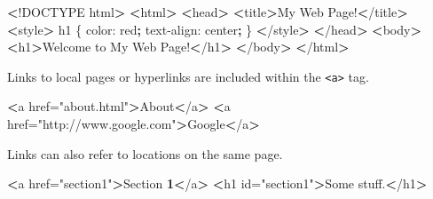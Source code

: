 \documentclass[]{book}
\newenvironment{Shaded}{\begin{snugshade}}{\end{snugshade}}
\newcommand{\KeywordTok}[1]{\textcolor[rgb]{0.13,0.29,0.53}{\textbf{#1}}}
\newcommand{\StringTok}[1]{\textcolor[rgb]{0.31,0.60,0.02}{#1}}
\newcommand{\FunctionTok}[1]{\textcolor[rgb]{0.00,0.00,0.00}{#1}}
\newcommand{\OperatorTok}[1]{\textcolor[rgb]{0.81,0.36,0.00}{\textbf{#1}}}
\newcommand{\ExtensionTok}[1]{#1}
\newcommand{\NormalTok}[1]{#1}
\begin{document}
\begin{Shaded}
\begin{Highlighting}[]
\OperatorTok{<}\NormalTok{!}\ExtensionTok{DOCTYPE}\NormalTok{ html}\OperatorTok{>}         
\OperatorTok{<}\ExtensionTok{html}\OperatorTok{>}                  
    \OperatorTok{<}\FunctionTok{head}\OperatorTok{>}                         
        \OperatorTok{<}\ExtensionTok{title}\OperatorTok{>}\NormalTok{My Web Page!}\OperatorTok{<}\NormalTok{/title}\OperatorTok{>}
        \OperatorTok{<}\ExtensionTok{style}\OperatorTok{>}                    
            \ExtensionTok{h1}\NormalTok{ \{                   }
                \ExtensionTok{color}\NormalTok{: red}\KeywordTok{;}        
                \ExtensionTok{text-align}\NormalTok{: center}\KeywordTok{;}
\NormalTok{            \}                      }
        \OperatorTok{<}\NormalTok{/}\ExtensionTok{style}\OperatorTok{>}                   
    \OperatorTok{<}\NormalTok{/}\ExtensionTok{head}\OperatorTok{>}                        
    \OperatorTok{<}\ExtensionTok{body}\OperatorTok{>}              
        \OperatorTok{<}\ExtensionTok{h1}\OperatorTok{>}\NormalTok{Welcome to My Web Page!}\OperatorTok{<}\NormalTok{/h1}\OperatorTok{>}
    \OperatorTok{<}\NormalTok{/}\ExtensionTok{body}\OperatorTok{>}             
\OperatorTok{<}\NormalTok{/}\ExtensionTok{html}\OperatorTok{>}                 
\end{Highlighting}
\end{Shaded}

Links to local pages or hyperlinks are included within the
\texttt{\textless{}a\textgreater{}} tag.

\begin{Shaded}
\begin{Highlighting}[]
\OperatorTok{<}\ExtensionTok{a}\NormalTok{ href=}\StringTok{"about.html"}\OperatorTok{>}\NormalTok{About}\OperatorTok{<}\NormalTok{/a}\OperatorTok{>}
\OperatorTok{<}\ExtensionTok{a}\NormalTok{ href=}\StringTok{"http://www.google.com"}\OperatorTok{>}\NormalTok{Google}\OperatorTok{<}\NormalTok{/a}\OperatorTok{>}
\end{Highlighting}
\end{Shaded}

Links can also refer to locations on the same page.

\begin{Shaded}
\begin{Highlighting}[]
\OperatorTok{<}\ExtensionTok{a}\NormalTok{ href=}\StringTok{"section1"}\OperatorTok{>}\NormalTok{Section }\OperatorTok{1<}\NormalTok{/a}\OperatorTok{>}
\OperatorTok{<}\ExtensionTok{h1}\NormalTok{ id=}\StringTok{"section1"}\OperatorTok{>}\NormalTok{Some stuff.}\OperatorTok{<}\NormalTok{/h1}\OperatorTok{>}
\end{Highlighting}
\end{Shaded}
\end{document}
